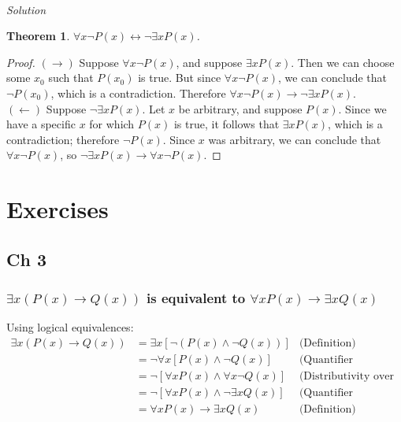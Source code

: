 \documentclass{report}
\newtheorem*{theorem}{Theorem}
\theoremstyle{definition}
\begin{document}
\vspace{1mm}\\
\textit{Solution}
\begin{theorem}
$\forall x\neg P(x)\leftrightarrow\neg\exists xP(x)$.
\end{theorem}
\begin{proof}
$(\to)$ Suppose $\forall x\neg P(x)$, and suppose $\exists xP(x)$. Then we can choose some $x_0$ such that $P(x_0)$ is true. But since $\forall x\neg P(x)$, we can conclude that $\neg P(x_0)$, which
is a contradiction. Therefore $\forall x\neg P(x)\to\neg\exists xP(x)$.\\
\indent$(\leftarrow)$ Suppose $\neg\exists xP(x)$. Let $x$ be arbitrary, and suppose $P(x)$. Since we have a specific $x$ for which $P(x)$ is true, it follows that $\exists xP(x)$, which is a
contradiction; therefore $\neg P(x)$. Since $x$ was arbitrary, we can conclude that $\forall x\neg P(x)$, so $\neg\exists xP(x)\to\forall x\neg P(x)$.
\end{proof}
\newpage

\subsection{}







\appendix
\chapter{Exercises}
\section{Ch 3}
\subsection{$\exists x(P(x)\to Q(x))$ is equivalent to $\forall xP(x)\to\exists xQ(x)$}
Using logical equivalences:
\begin{align*}
\exists x(P(x)\to Q(x))&=\exists x[\neg(P(x)\land\neg Q(x))]&\text{(Definition)}\\
&=\neg\forall x[P(x)\land\neg Q(x)]&\text{(Quantifier negation)}\\
&=\neg[\forall xP(x)\land\forall x\neg Q(x)]&\text{(Distributivity over conjuction)}\\
&=\neg[\forall xP(x)\land\neg\exists xQ(x)]&\text{(Quantifier negation)}\\
&=\forall xP(x)\to\exists xQ(x)&\text{(Definition)}
\end{align*}
\end{document}
